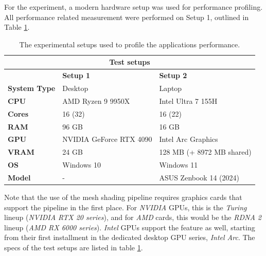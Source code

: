 For the experiment, a modern hardware setup was used for performance profiling. All performance related 
measurement were performed on Setup 1, outlined in Table \ref{tbl:hardware-setup}.

\begin{table}[h]          %
  \centering
    \begin{tabular}{|lll|}
        \hline
        \multicolumn{3}{|c|}{\textbf{Test setups}}                                                                              \\ \hline
        \multicolumn{1}{|l|}{}                     & \multicolumn{1}{l|}{\textbf{Setup 1}}          & \textbf{Setup 2}          \\ \hline
        \multicolumn{1}{|l|}{\textbf{System Type}} & \multicolumn{1}{l|}{Desktop}                   & Laptop                    \\
        \multicolumn{1}{|l|}{\textbf{CPU}}         & \multicolumn{1}{l|}{AMD Ryzen 9 9950X}         & Intel Ultra 7 155H        \\
        \multicolumn{1}{|l|}{\textbf{Cores}}       & \multicolumn{1}{l|}{16 (32)}                   & 16 (22)                   \\
        \multicolumn{1}{|l|}{\textbf{RAM}}         & \multicolumn{1}{l|}{96 GB}                     & 16 GB                     \\
        \multicolumn{1}{|l|}{\textbf{GPU}}         & \multicolumn{1}{l|}{NVIDIA GeForce RTX 4090}   & Intel Arc Graphics        \\
        \multicolumn{1}{|l|}{\textbf{VRAM}}        & \multicolumn{1}{l|}{24 GB}                     & 128 MB (+ 8972 MB shared) \\
        \multicolumn{1}{|l|}{\textbf{OS}}          & \multicolumn{1}{l|}{Windows 10}                & Windows 11                \\
        \multicolumn{1}{|l|}{\textbf{Model}}       & \multicolumn{1}{l|}{-}                         & ASUS Zenbook 14 (2024)    \\ \hline
    \end{tabular}
    \caption{The experimental setups used to profile the applications performance.}
    \label{tbl:hardware-setup}
\end{table}

\noindent
Note that the use of the mesh shading pipeline requires graphics cards that support the pipeline in the first place. 
For \emph{NVIDIA} \ac{GPU}s, this is the \emph{Turing} lineup (\emph{NVIDIA RTX 20 series}), and for \emph{AMD} cards, 
this would be the \emph{RDNA 2} lineup (\emph{AMD RX 6000 series}). \emph{Intel} \ac{GPU}s support the feature as 
well, starting from their first installment in the dedicated desktop \ac{GPU} series, \emph{Intel Arc}. The specs of 
the test setups are listed in table \ref{tbl:hardware-setup}. \\



